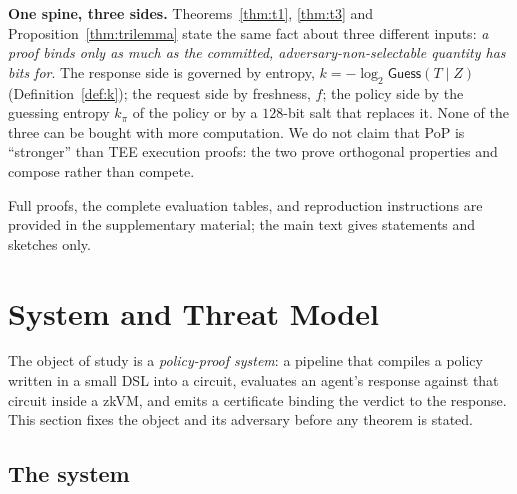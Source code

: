 \documentclass[10pt,journal,compsoc]{IEEEtran}
\begin{document}
\smallskip
\noindent\textbf{One spine, three sides.} Theorems~\ref{thm:t1}, \ref{thm:t3} and
Proposition~\ref{thm:trilemma} state the same fact about three different inputs:
\emph{a proof binds only as much as the committed, adversary-non-selectable
quantity has bits for}. The response side is governed by entropy,
$k = -\log_2 \mathsf{Guess}(T \mid Z)$ (Definition~\ref{def:k}); the request side
by freshness, $f$; the policy side by the guessing entropy $k_\pi$ of the policy
or by a $128$-bit salt that replaces it. None of the three can be bought with
more computation. We do not claim that PoP is ``stronger'' than TEE execution
proofs: the two prove orthogonal properties and compose rather than compete.

\smallskip
\noindent Full proofs, the complete evaluation tables, and reproduction
instructions are provided in the supplementary material; the main text gives
statements and sketches only.

\section{System and Threat Model}
\label{sec:system}

The object of study is a \emph{policy-proof system}: a pipeline that compiles a
policy written in a small DSL into a circuit, evaluates an agent's response
against that circuit inside a zkVM, and emits a certificate binding the verdict
to the response. This section fixes the object and its adversary before any
theorem is stated.

\subsection{The system}
\label{sec:system-overview}
\end{document}
